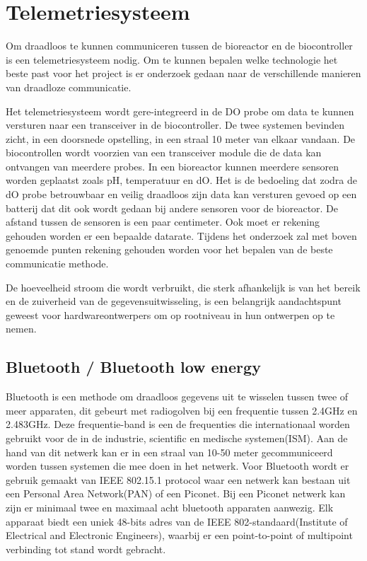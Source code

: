 \section{Telemetriesysteem}
Om draadloos te kunnen communiceren tussen de bioreactor en de biocontroller is een telemetriesysteem nodig. Om te kunnen bepalen welke technologie het beste past voor het project is er onderzoek gedaan naar de verschillende manieren van draadloze communicatie.

Het telemetriesysteem wordt gere-integreerd in de DO probe om data te kunnen versturen naar een transceiver in de biocontroller. De twee systemen bevinden zicht, in een doorsnede opstelling, in een straal 10 meter van elkaar vandaan. De biocontrollen wordt voorzien van een transceiver module die de data kan ontvangen van meerdere probes. In een bioreactor kunnen meerdere sensoren worden geplaatst zoals pH, temperatuur en dO. Het is de bedoeling dat zodra de dO probe betrouwbaar en veilig draadloos zijn data kan versturen gevoed op een batterij dat dit ook wordt gedaan bij andere sensoren voor de bioreactor. De afstand tussen de sensoren is een paar centimeter. Ook moet er rekening gehouden worden er een bepaalde datarate. Tijdens het onderzoek zal met boven genoemde punten rekening gehouden worden voor het bepalen van de beste communicatie methode. 

De hoeveelheid stroom die wordt verbruikt, die sterk afhankelijk is van het bereik en de zuiverheid van de gegevensuitwisseling, is een belangrijk aandachtspunt geweest voor hardwareontwerpers om op rootniveau in hun ontwerpen op te nemen.

\subsection{Bluetooth / Bluetooth low energy}
Bluetooth is een methode om draadloos gegevens uit te wisselen tussen twee of meer apparaten, dit gebeurt met radiogolven bij een frequentie tussen 2.4GHz en 2.483GHz. Deze frequentie-band is een de frequenties die internationaal worden gebruikt voor de in de industrie, scientific en medische systemen(ISM). Aan de hand van dit netwerk kan er in een straal van 10-50 meter gecommuniceerd worden tussen systemen die mee doen in het netwerk. Voor Bluetooth wordt er gebruik gemaakt van IEEE 802.15.1 protocol waar een netwerk kan bestaan uit een Personal Area Network(PAN) of een Piconet. Bij een Piconet netwerk kan zijn er minimaal twee en maximaal acht bluetooth apparaten aanwezig. Elk apparaat biedt een uniek 48-bits adres van de IEEE 802-standaard(Institute of Electrical and Electronic Engineers), waarbij er een point-to-point of multipoint verbinding tot stand wordt gebracht.\cite{wireless_types}

